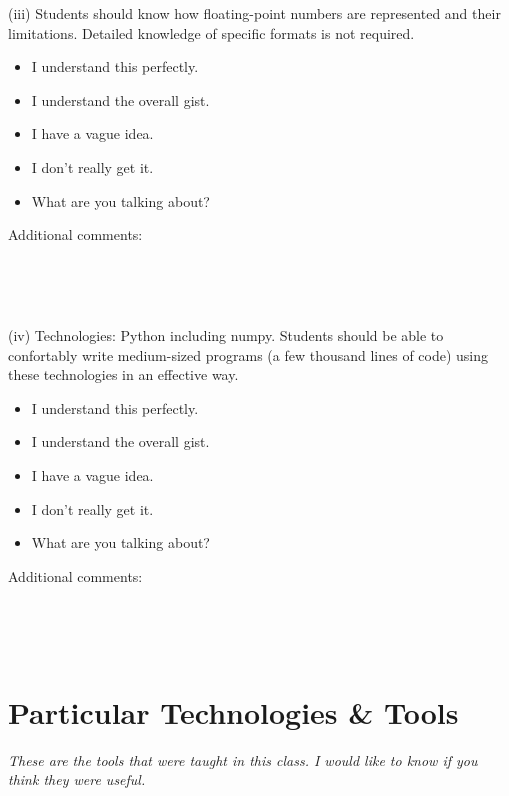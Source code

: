 \documentclass[article,twoside]{memoir}
\newcommand*{\fillunderscore}{~\hrulefill}
\newcommand*{\checkbox}{$\square$}
\newcommand{\header}[1]{\textsl{#1}}
\begin{document}
    (iii) Students should know how floating-point numbers are represented and their limitations. Detailed knowledge of specific formats is not required.
\begin{itemize}[\checkbox]
\item I understand this perfectly.
\item I understand the overall gist.
\item I have a vague idea.
\item I don't really get it.
\item What are you talking about?
\end{itemize}
Additional comments:
\fillunderscore\par
\fillunderscore\par
\fillunderscore\par


    (iv) Technologies: Python including numpy. Students should be able to confortably write medium-sized programs (a few thousand lines of code) using these technologies in an effective way.

\begin{itemize}[\checkbox]
\item I understand this perfectly.
\item I understand the overall gist.
\item I have a vague idea.
\item I don't really get it.
\item What are you talking about?
\end{itemize}
Additional comments:
\fillunderscore\par
\fillunderscore\par
\fillunderscore\par


\section{Particular Technologies \& Tools}

\header{These are the tools that were taught in this class. I would like to know if you think they were useful.}
\end{document}
